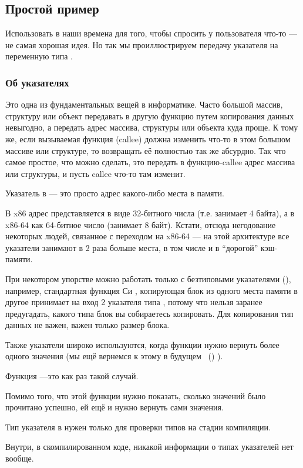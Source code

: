 \subsection{Простой пример}



Использовать \scanf в наши времена для того, чтобы спросить у пользователя что-то --- не самая хорошая идея.
Но так мы проиллюстрируем передачу указателя на переменную типа \Tint.

\subsubsection{Об указателях}
\myindex{\CLanguageElements!\Pointers}

Это одна из фундаментальных вещей в информатике.
Часто большой массив, структуру или объект передавать в другую функцию путем копирования данных невыгодно, а передать адрес массива, структуры или объекта куда проще.
К тому же, если вызываемая функция (\gls{callee}) должна изменить что-то в этом большом массиве или структуре, то возвращать её полностью так же абсурдно.
Так что самое простое, что можно сделать, это передать в функцию-\gls{callee} адрес массива или структуры, и пусть \gls{callee} что-то там изменит.

Указатель в \CCpp --- это просто адрес какого-либо места в памяти.

В x86 адрес представляется в виде 32-битного числа (т.е. занимает 4 байта), а в x86-64 как 64-битное число (занимает 8 байт).
Кстати, отсюда негодование некоторых людей, связанное с переходом на x86-64 --- на этой архитектуре все указатели занимают в 2 раза больше места, в том числе и в ``дорогой'' кэш-памяти.

При некотором упорстве можно работать только с безтиповыми указателями (), например, стандартная функция Си ,
копирующая блок из одного места памяти в другое принимает на вход 2 указателя типа , потому что нельзя заранее предугадать, какого типа блок вы собираетесь копировать.
Для копирования тип данных не важен, важен только размер блока.

Также указатели широко используются, когда функции нужно вернуть более одного значения
(мы ещё вернемся к этому в будущем
~()
).

Функция ---это как раз такой случай.

Помимо того, что этой функции нужно показать, сколько значений было прочитано успешно, ей ещё и нужно вернуть сами значения.

Тип указателя в \CCpp нужен только для проверки типов на стадии компиляции.

Внутри, в скомпилированном коде, никакой информации о типах указателей нет вообще.





